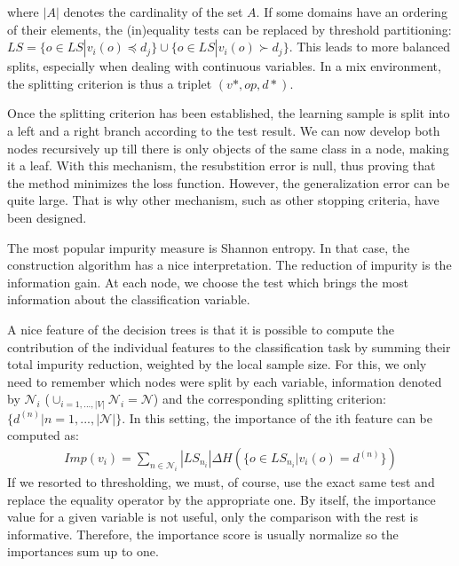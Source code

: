 \documentclass[a4paper]{report}
\newlength{\larg}
\begin{document}
\begin{leftbar}
	where $|A|$ denotes the cardinality of the set $A$. If some domains have an ordering of their elements, the (in)equality tests can be replaced by threshold partitioning: $LS = \{o \in LS | v_i(o) \preceq d_j\} \cup \{o \in LS | v_i(o) \succ d_j\}$. This leads to more balanced splits, especially when dealing with continuous variables. In a mix environment, the splitting criterion is thus a triplet $(v*, op, d*)$.
	\par
	Once the splitting criterion has been established, the learning sample is split into a left and a right branch according to the test result. We can now develop both nodes recursively up till there is only objects of the same class in a node, making it a leaf. With this mechanism, the resubstition error is null, thus proving that the method minimizes the loss function. However, the generalization error can be quite large. That is why other mechanism, such as other stopping criteria, have been designed.
	\par
	The most popular impurity measure is Shannon entropy. In that case, the construction algorithm has a nice interpretation. The reduction of impurity is the information gain. At each node, we choose the test which brings the most information about the classification variable.
	\par
	A nice feature of the decision trees is that it is possible to compute the contribution of the individual features to the classification task by summing their total impurity reduction, weighted by the local sample size. For this, we only need to remember which nodes were split by each variable, information denoted by $\mathcal{N}_i$ ($ \cup_{i=1,..., |V|}\mathcal{N}_i = \mathcal{N}$) and the corresponding splitting criterion: $\{d^{(n)} | n = 1,..., |\mathcal{N}|\}$. In this setting, the importance of the ith feature can be computed as: 
	\begin{align*}
		Imp(v_i) = \sum_{n \in \mathcal{N}_i} |LS_{n_i}| \Delta H(\{o \in LS_{n_i}| v_i(o) = d^{(n)}\}) 
	\end{align*}
If we resorted to thresholding, we must, of course, use the exact same test and replace the equality operator by the appropriate one. By itself, the importance value for a given variable is not useful, only the comparison with the rest is informative. Therefore, the importance score is usually normalize so the importances sum up to one.
\end{leftbar}
\end{document}
